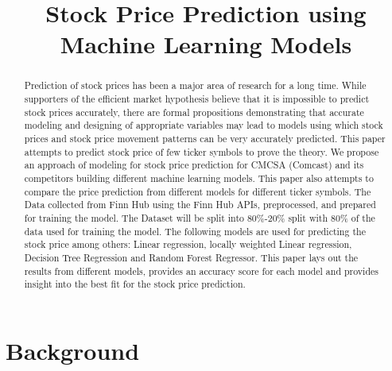 \documentclass[conference]{IEEEtran}
\begin{document}
\title{Stock Price Prediction using Machine Learning Models}

\author{
}

\maketitle

\begin{abstract}
Prediction of stock prices has been a major area of research for a long time.
While supporters of the efficient market hypothesis believe that it is impossible to predict stock prices accurately, there are formal propositions demonstrating that accurate modeling and designing of appropriate variables may lead to models using which stock prices and stock price movement patterns can be very accurately predicted.
This paper attempts to predict stock price of few ticker symbols to prove the theory.
We propose an approach of modeling for stock price prediction for CMCSA (Comcast) and its competitors building different machine learning models.
This paper also attempts to compare the price prediction from different models for different ticker symbols.
The Data collected from Finn Hub using the Finn Hub APIs, preprocessed, and prepared for training the model.
The Dataset will be split into 80\%-20\% split with 80\% of the data used for training the model.
The following models are used for predicting the stock price among others: Linear regression, locally weighted Linear regression, Decision Tree Regression and Random Forest Regressor.
This paper lays out the results from different models, provides an accuracy score for each model and provides insight into the best fit for the stock price prediction.
\end{abstract}

\section{Background}
\end{document}
